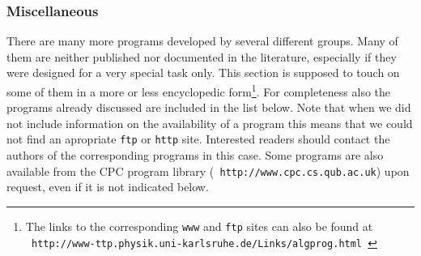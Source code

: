 

\subsubsection{\label{submisc}Miscellaneous}
%
There are many more programs developed by several different groups.
Many of them are neither published nor documented in the literature,
especially if they were designed for a very special task only.  This
section is supposed to touch on some of them in a more or less encyclopedic
form\footnote{ The links to the corresponding {\tt www} and {\tt ftp}
  sites can also be found at\\ {\tt
    http://www-ttp.physik.uni-karlsruhe.de/Links/algprog.html } }.  For
completeness also the programs already discussed are included in the
list below.  Note that when we did not include information on the
availability of a program this means that we could not find an
apropriate {\tt ftp} or {\tt http} site.  Interested readers should
contact the authors of the corresponding programs in this case.  Some
programs are also available from the CPC program library ({\tt
  http://www.cpc.cs.qub.ac.uk}) upon request, even if it is not
indicated below.

